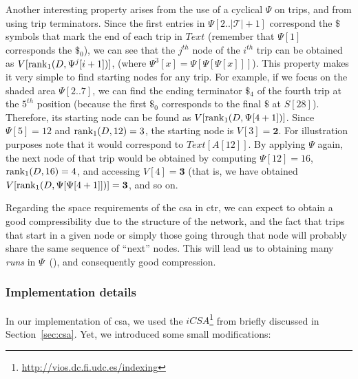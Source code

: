 	Another interesting property arises from the use of a cyclical $\Psi$ on trips, and from using trip terminators.
	Since the first entries in $\Psi[2..|\mathcal{T}|+1]$ correspond the $\$$ symbols that 
	mark the end of each trip in $Text$ (remember that $\Psi[1]$ corresponds the $\$_0$), we can see that the $j^{th}$ node of the $i^{th}$ trip can
	be obtained as $V[\operatorname{rank}_1(D, \Psi^j[i+1])]$, (where $\Psi^3[x]= \Psi[\Psi[\Psi[x]]]$). This property
	makes it very simple to find starting nodes for any trip.
	For example, if we focus on the shaded area $\Psi[2..7]$, we can find the ending terminator $\$_4$ of the
	fourth trip at the $5^{th}$ position (because the first $\$_0$
	corresponds to the final $\$$ at $S[28]$). Therefore, its starting node can be found 
	as $V[\operatorname{rank}_1(D, \Psi[4+1])]$. Since $\Psi[5] = 12$ and $\operatorname{rank}_1(D,12)= 3$, 
	the starting node is $V[3]=\mathbf{2}$. For illustration purposes note that it would correspond to $Text[A[12]]$.
	By applying $\Psi$ again, the next node of that trip would be obtained by computing $\Psi[12] = 16$, 
	$\operatorname{rank}_1(D,16)=4$, and accessing $V[4]=\mathbf{3}$  (that is, we have obtained 
	 $V[\operatorname{rank}_1(D, \Psi[\Psi[4+1]])]=\mathbf{3}$, and so on. 

	Regarding the space requirements of the \gls{csa} in \gls{ctr}, we can expect to obtain a good compressibility
	due to the structure of the network, and the fact that trips that start in a given node or simply
	those going through that node will probably share the same sequence of ``next'' nodes. This will
	lead us to obtaining many {\em runs} in $\Psi$~(\cite{NM07}), and consequently good compression.

	\subsubsection{Implementation details} In our implementation of \gls{csa}, we used the
	$iCSA$\footnote{\url{http://vios.dc.fi.udc.es/indexing}} from \cite{FBNCPR12} briefly discussed 
	in Section~\ref{sec:csa}. Yet, we introduced some small modifications:

